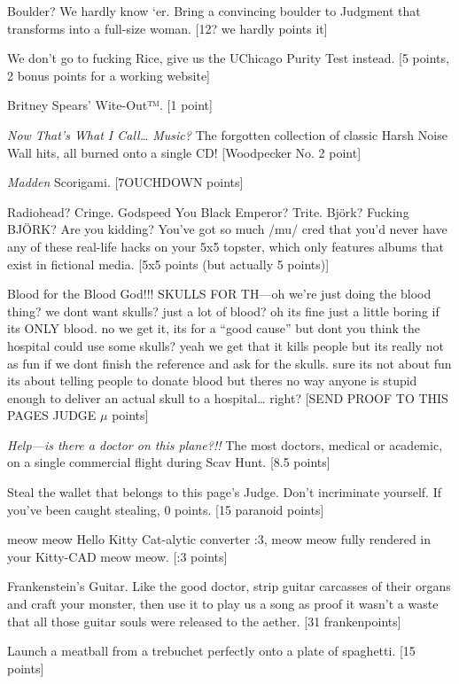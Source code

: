 \documentclass{book}
\begin{document}
\begin{list}{}{}
\item Boulder? We hardly know ‘er. Bring a convincing boulder to Judgment that transforms into a full-size woman. [12? we hardly points it]
\item We don’t go to fucking Rice, give us the UChicago Purity Test instead. [5 points, 2 bonus points for a working website]
\item Britney Spears' Wite-Out™. [1 point]
\item \textit{Now That’s What I Call… Music?} The forgotten collection of classic Harsh Noise Wall hits, all burned onto a single CD! [Woodpecker No. 2 point]
\item \textit{Madden} Scorigami. [7OUCHDOWN points]
\item Radiohead? Cringe. Godspeed You Black Emperor? Trite. Björk? Fucking BJÖRK? Are you kidding? You’ve got so much /mu/ cred that you’d never have any of these real-life hacks on your 5x5 topster, which only features albums that exist in fictional media. [5x5 points (but actually 5 points)]
\item Blood for the Blood God!!! SKULLS FOR TH---oh we’re just doing the blood thing? we dont want skulls? just a lot of blood? oh its fine just a little boring if its ONLY blood. no we get it, its for a “good cause” but dont you think the hospital could use some skulls? yeah we get that it kills people but its really not as fun if we dont finish the reference and ask for the skulls. sure its not about fun its about telling people to donate blood but theres no way anyone is stupid enough to deliver an actual skull to a hospital… right? [SEND PROOF TO THIS PAGES JUDGE $\mu$ points]
\item \textit{Help---is there a doctor on this plane?!!} The most doctors, medical or academic, on a single commercial flight during Scav Hunt. [8.5 points] %
\item Steal the wallet that belongs to this page's Judge. Don't incriminate yourself. If you've been caught stealing, 0 points. [15 paranoid points]
\item meow meow Hello Kitty Cat-alytic converter :3, meow meow fully rendered in your Kitty-CAD meow meow. [:3 points]
\item Frankenstein’s Guitar. Like the good doctor, strip guitar carcasses of their organs and craft your monster, then use it to play us a song as proof it wasn’t a waste that all those guitar souls were released to the aether. [31 frankenpoints]
\item Launch a meatball from a trebuchet perfectly onto a plate of spaghetti. [15 points]

\end{list}
\end{document}
